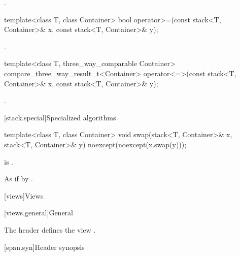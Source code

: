 \begin{itemdescr}
\pnum
\returns
{}.
\end{itemdescr}

%
\begin{itemdecl}
template<class T, class Container>
    bool operator>=(const stack<T, Container>& x, const stack<T, Container>& y);
\end{itemdecl}

\begin{itemdescr}
\pnum
\returns
{}.
\end{itemdescr}

%
\begin{itemdecl}
template<class T, three_way_comparable Container>
  compare_three_way_result_t<Container>
    operator<=>(const stack<T, Container>& x, const stack<T, Container>& y);
\end{itemdecl}

\begin{itemdescr}
\pnum
\returns
{}.
\end{itemdescr}

[stack.special]{Specialized algorithms}

%
\begin{itemdecl}
template<class T, class Container>
  void swap(stack<T, Container>& x, stack<T, Container>& y) noexcept(noexcept(x.swap(y)));
\end{itemdecl}

\begin{itemdescr}
\pnum
\constraints
{} is .

\pnum
\effects
As if by .
\end{itemdescr}

[views]{Views}

[views.general]{General}

\pnum
The header  defines the view .

[span.syn]{Header  synopsis}%

